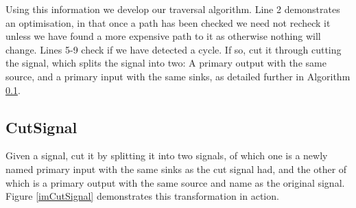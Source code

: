\documentclass[12pt,final,oneside]{dwThesis} %
\begin{document}
   Using this information we develop our traversal
   algorithm.  Line 2 demonstrates an optimisation, in that once a path has
   been checked we need not recheck it unless we have found a more expensive
   path to it as otherwise nothing will change.  Lines 5-9 check if we have
   detected a cycle. If so, cut it through cutting the signal, which splits
   the signal into two: A primary output with the same source, and a primary
   input with the same sinks, as detailed further in Algorithm
   \ref{cutsignal}.

   \newpage 
   \subsection{CutSignal}
   \label{cutsignal}
   Given a signal, cut it by
   splitting it into two signals, of which one is a newly named primary input
   with the same sinks as the cut signal had, and the other of which is a
   primary output with the same source and name as the original signal.
   Figure \ref{imCutSignal} demonstrates this transformation in action.
\end{document}
